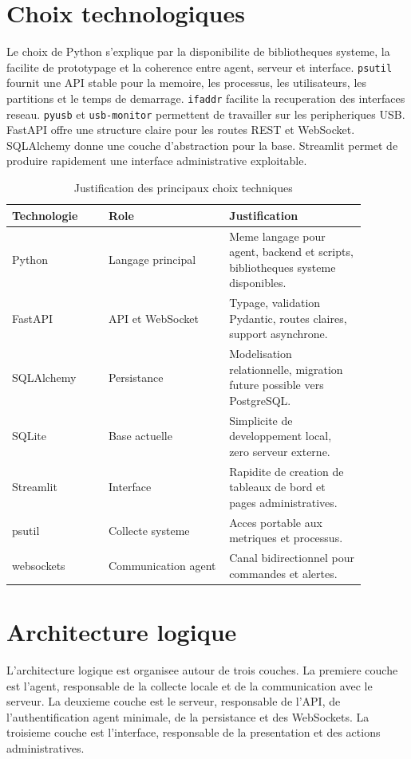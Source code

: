 \documentclass[12pt,a4paper]{report}
\begin{document}
\section{Choix technologiques}
Le choix de Python s'explique par la disponibilite de bibliotheques systeme, la facilite de prototypage et la coherence entre agent, serveur et interface. \texttt{psutil} fournit une API stable pour la memoire, les processus, les utilisateurs, les partitions et le temps de demarrage. \texttt{ifaddr} facilite la recuperation des interfaces reseau. \texttt{pyusb} et \texttt{usb-monitor} permettent de travailler sur les peripheriques USB. FastAPI offre une structure claire pour les routes REST et WebSocket. SQLAlchemy donne une couche d'abstraction pour la base. Streamlit permet de produire rapidement une interface administrative exploitable.

\begin{longtable}{p{0.24\linewidth}p{0.30\linewidth}p{0.34\linewidth}}
\caption{Justification des principaux choix techniques}\\
\toprule
\textbf{Technologie} & \textbf{Role} & \textbf{Justification}\\
\midrule
Python & Langage principal & Meme langage pour agent, backend et scripts, bibliotheques systeme disponibles.\\
FastAPI & API et WebSocket & Typage, validation Pydantic, routes claires, support asynchrone.\\
SQLAlchemy & Persistance & Modelisation relationnelle, migration future possible vers PostgreSQL.\\
SQLite & Base actuelle & Simplicite de developpement local, zero serveur externe.\\
Streamlit & Interface & Rapidite de creation de tableaux de bord et pages administratives.\\
psutil & Collecte systeme & Acces portable aux metriques et processus.\\
websockets & Communication agent & Canal bidirectionnel pour commandes et alertes.\\
\bottomrule
\end{longtable}

\section{Architecture logique}
L'architecture logique est organisee autour de trois couches. La premiere couche est l'agent, responsable de la collecte locale et de la communication avec le serveur. La deuxieme couche est le serveur, responsable de l'API, de l'authentification agent minimale, de la persistance et des WebSockets. La troisieme couche est l'interface, responsable de la presentation et des actions administratives.
\end{document}
